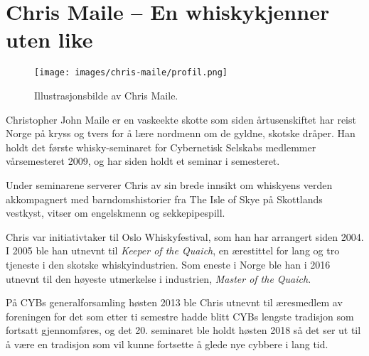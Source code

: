 \chapter{Chris Maile -- En whiskykjenner uten like}

\author{Skrevet av Torgeir Lebesbye}

\begin{wrapfigure}{l}{7cm}
	\centering
	\texttt{[image: images/chris-maile/profil.png]}
	\label{fig:chris-maile}
	\caption{Illustrasjonsbilde av Chris Maile.}
\end{wrapfigure}

Christopher John Maile er en vaskeekte skotte som siden årtusenskiftet har reist Norge på kryss og tvers for å lære nordmenn om de gyldne, skotske dråper. Han holdt det første whisky-seminaret for Cybernetisk Selskabs medlemmer vårsemesteret 2009, og har siden holdt et seminar i semesteret.

Under seminarene serverer Chris av sin brede innsikt om whiskyens verden akkompagnert med barndomshistorier fra The Isle of Skye på Skottlands vestkyst, vitser om engelskmenn og sekkepipespill.

Chris var initiativtaker til Oslo Whiskyfestival, som han har arrangert siden 2004. I 2005 ble han utnevnt til \textit{Keeper of the Quaich}, en ærestittel for lang og tro tjeneste i den skotske whiskyindustrien. Som eneste i Norge ble han i 2016 utnevnt til den høyeste utmerkelse i industrien, \textit{Master of the Quaich}.

På CYBs generalforsamling høsten 2013 ble Chris utnevnt til æresmedlem av foreningen for det som etter ti semestre hadde blitt CYBs lengste tradisjon som fortsatt gjennomføres, og det 20. seminaret ble holdt høsten 2018 så det ser ut til å være en tradisjon som vil kunne fortsette å glede nye cybbere i lang tid.

